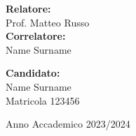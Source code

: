 \begin{titlepage}
\vspace{24mm}

\begin{minipage}[t]{1\textwidth}
    \begin{multicols}{2}
    	{\normalsize{\textbf{Relatore:}}{\normalsize\vspace{1mm}
        \\ \normalsize{Prof. Matteo Russo}}} \\ 

        {\normalsize{\textbf{Correlatore:}}{\normalsize\vspace{1mm}
        \\ \normalsize{Name Surname }}} \\
        
         \columnbreak
         \columnbreak

         \begin{flushright}
            {\normalsize{\textbf{Candidato:}}{\normalsize\vspace{1mm}
            \\ \normalsize{Name Surname}\\
            \normalsize{Matricola  123456}}} \\
         \end{flushright}
    \end{multicols}
\end{minipage}

\vspace*{\fill}

\begin{center}
        \normalsize{Anno Accademico 2023/2024}
\end{center}

\end{titlepage}
